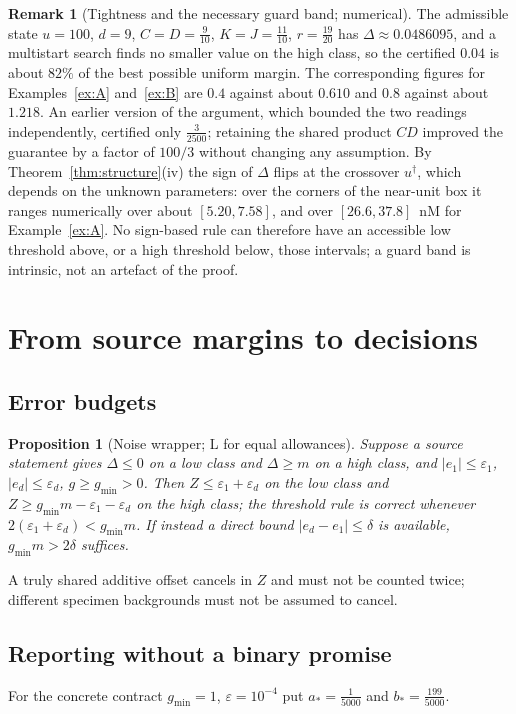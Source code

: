 \documentclass[11pt]{article}
\theoremstyle{plain}
\newtheorem{proposition}[theorem]{Proposition}
\theoremstyle{definition}
\newtheorem{remark}[theorem]{Remark}
\numberwithin{equation}{section}
\newcommand{\eps}{\varepsilon}
\newcommand{\gmin}{g_{\min}}
\newcommand{\Lean}{\textsf{L}}   %
\begin{document}
\begin{remark}[Tightness and the necessary guard band; numerical]\label{rem:tight}
The admissible state $u=100$, $d=9$, $C=D=\frac9{10}$, $K=J=\frac{11}{10}$,
$r=\frac{19}{20}$ has $\Delta\approx0.0486095$, and a multistart search finds no
smaller value on the high class, so the certified $0.04$ is about $82\%$ of the
best possible uniform margin. The corresponding figures for Examples~\ref{ex:A}
and~\ref{ex:B} are $0.4$ against about $0.610$ and $0.8$ against about $1.218$. An earlier version of the argument, which bounded the two readings
independently, certified only $\frac3{2500}$; retaining the shared product $CD$
improved the guarantee by a factor of $100/3$ without changing any assumption. By
Theorem~\ref{thm:structure}(iv) the sign of $\Delta$ flips at the crossover
$u^\dagger$, which depends on the unknown parameters: over the corners of the
near-unit box it ranges numerically over about $[5.20,7.58]$, and over
$[26.6,37.8]$~nM for Example~\ref{ex:A}. No sign-based rule can therefore have an
accessible low threshold above, or a high threshold below, those intervals; a
guard band is intrinsic, not an artefact of the proof.
\end{remark}

\section{From source margins to decisions}\label{sec:decisions}

\subsection{Error budgets}
\begin{proposition}[Noise wrapper; \Lean{} for equal allowances]\label{prop:noise}
Suppose a source statement gives $\Delta\le0$ on a low class and $\Delta\ge m$ on a
high class, and $|e_1|\le\eps_1$, $|e_d|\le\eps_d$, $g\ge\gmin>0$. Then
$Z\le\eps_1+\eps_d$ on the low class and $Z\ge\gmin m-\eps_1-\eps_d$ on the high
class; the threshold rule is correct whenever $2(\eps_1+\eps_d)<\gmin m$. If instead
a direct bound $|e_d-e_1|\le\delta$ is available, $\gmin m>2\delta$ suffices.
\end{proposition}
A truly shared additive offset cancels in $Z$ and must not be counted twice;
different specimen backgrounds must not be assumed to cancel.

\subsection{Reporting without a binary promise}\label{sec:unpromised}
For the concrete contract $\gmin=1$, $\eps=10^{-4}$ put $a_*=\frac1{5000}$ and
$b_*=\frac{199}{5000}$.
\end{document}
